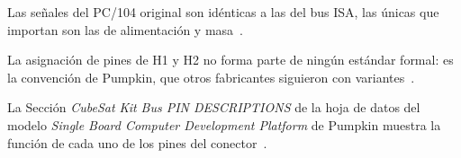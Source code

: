 Las señales del PC/104 original son idénticas a las del bus ISA, las únicas que importan son las de alimentación y masa~\cite[Apéndice~B]{pc104v24}.

La asignación de pines de H1 y H2 no forma parte de ningún estándar formal: es la convención de Pumpkin, que otros fabricantes siguieron con variantes~\cite{cubesatshopfaq,pumpkindb}.

La Sección \emph{CubeSat Kit Bus PIN DESCRIPTIONS} de la hoja de datos del modelo \emph{Single Board Computer Development Platform} de Pumpkin muestra la función de cada uno de los pines del conector~\cite{pumpkindb}.